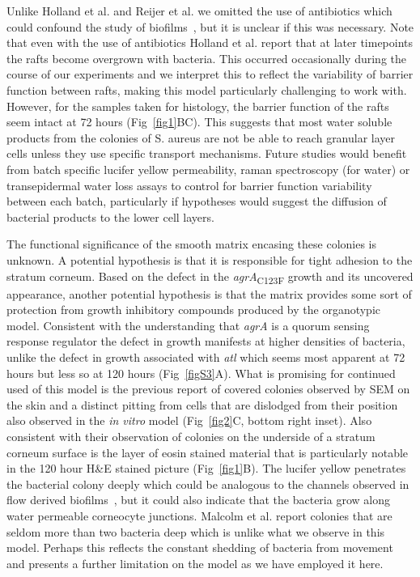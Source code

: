 \documentclass[10pt,letterpaper]{article}
\begin{document}
Unlike Holland et al. and Reijer et al. we omitted the use of antibiotics which could confound the study of biofilms~\cite{kaplan_low_2012}, but it is unclear if this was necessary.
Note that even with the use of antibiotics Holland et al. report that at later timepoints the rafts become overgrown with bacteria.
This occurred occasionally during the course of our experiments and we interpret this to reflect the variability of barrier function between rafts, making this model particularly challenging to work with.
However, for the samples taken for histology, the barrier function of the rafts seem intact at 72 hours (Fig~\ref{fig1}BC).
This suggests that most water soluble products from the colonies of S. aureus are not be able to reach granular layer cells unless they use specific transport mechanisms.
Future studies would benefit from batch specific lucifer yellow permeability, raman spectroscopy (for water) or transepidermal water loss assays to control for barrier function variability between each batch, particularly if hypotheses would suggest the diffusion of bacterial products to the lower cell layers.

The functional significance of the smooth matrix encasing these colonies is unknown.
A potential hypothesis is that it is responsible for tight adhesion to the stratum corneum.
Based on the defect in the \textit{agrA}\textsubscript{C123F} growth and its uncovered appearance,  another potential hypothesis is that the matrix provides some sort of protection from growth inhibitory compounds produced by the organotypic model.
Consistent with the understanding that \textit{agrA} is a quorum sensing response regulator the defect in growth manifests at higher densities of bacteria, unlike the defect in growth associated with \textit{atl} which seems most apparent at 72 hours but less so at 120 hours (Fig~\ref{figS3}A).
What is promising for continued used of this model is the previous report of covered colonies observed by SEM on the skin and a distinct pitting from cells that are dislodged from their position~\cite{malcolm_demonstration_1980} also observed in the \textit{in vitro} model (Fig~\ref{fig2}C, bottom right inset).
Also consistent with their observation of colonies on the underside of a stratum corneum surface is the layer of eosin stained material that is particularly notable in the 120 hour H\&E stained picture (Fig~\ref{fig1}B).
The lucifer yellow penetrates the bacterial colony deeply which could be analogous to the channels observed in flow derived biofilms~\cite{periasamy_how_2012}, but it could also indicate that the bacteria grow along water permeable corneocyte junctions.
Malcolm et al. report colonies that are seldom more than two bacteria deep which is unlike what we observe in this model.
Perhaps this reflects the constant shedding of bacteria from movement and presents a further limitation on the model as we have employed it here.
\end{document}
